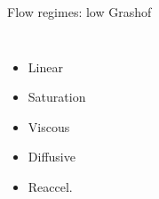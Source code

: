 \documentclass[12pt]{beamer}
\begin{document}
\begin{frame}{Flow regimes: low Grashof}
\begin{columns}[c]
\begin{itemize}
  \item Linear 
  \item Saturation
  \item Viscous
  \item Diffusive
  \item Reaccel.
\end{itemize}

\end{columns}
\end{frame}
\end{document}
